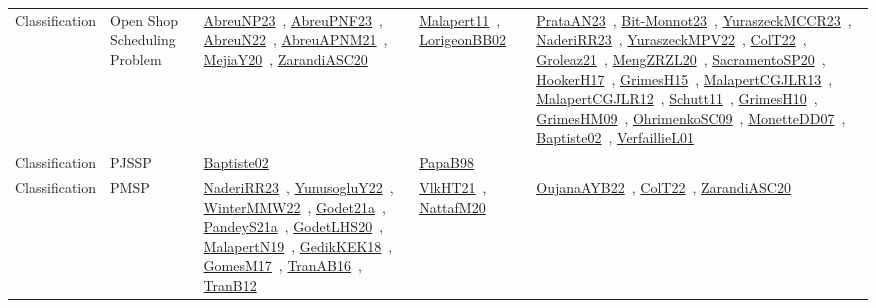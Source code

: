 {\begin{longtable}{lp{3cm}>{\raggedright\arraybackslash}p{6cm}>{\raggedright\arraybackslash}p{6cm}>{\raggedright\arraybackslash}p{8cm}}
Classification & Open Shop Scheduling Problem & \href{works/AbreuNP23.pdf}{AbreuNP23}~\cite{AbreuNP23}, \href{works/AbreuPNF23.pdf}{AbreuPNF23}~\cite{AbreuPNF23}, \href{works/AbreuN22.pdf}{AbreuN22}~\cite{AbreuN22}, \href{works/AbreuAPNM21.pdf}{AbreuAPNM21}~\cite{AbreuAPNM21}, \href{works/MejiaY20.pdf}{MejiaY20}~\cite{MejiaY20}, \href{works/ZarandiASC20.pdf}{ZarandiASC20}~\cite{ZarandiASC20} & \href{works/Malapert11.pdf}{Malapert11}~\cite{Malapert11}, \href{works/LorigeonBB02.pdf}{LorigeonBB02}~\cite{LorigeonBB02} & \href{works/PrataAN23.pdf}{PrataAN23}~\cite{PrataAN23}, \href{works/Bit-Monnot23.pdf}{Bit-Monnot23}~\cite{Bit-Monnot23}, \href{works/YuraszeckMCCR23.pdf}{YuraszeckMCCR23}~\cite{YuraszeckMCCR23}, \href{works/NaderiRR23.pdf}{NaderiRR23}~\cite{NaderiRR23}, \href{works/YuraszeckMPV22.pdf}{YuraszeckMPV22}~\cite{YuraszeckMPV22}, \href{works/ColT22.pdf}{ColT22}~\cite{ColT22}, \href{works/Groleaz21.pdf}{Groleaz21}~\cite{Groleaz21}, \href{works/MengZRZL20.pdf}{MengZRZL20}~\cite{MengZRZL20}, \href{works/SacramentoSP20.pdf}{SacramentoSP20}~\cite{SacramentoSP20}, \href{works/HookerH17.pdf}{HookerH17}~\cite{HookerH17}, \href{works/GrimesH15.pdf}{GrimesH15}~\cite{GrimesH15}, \href{works/MalapertCGJLR13.pdf}{MalapertCGJLR13}~\cite{MalapertCGJLR13}, \href{works/MalapertCGJLR12.pdf}{MalapertCGJLR12}~\cite{MalapertCGJLR12}, \href{works/Schutt11.pdf}{Schutt11}~\cite{Schutt11}, \href{works/GrimesH10.pdf}{GrimesH10}~\cite{GrimesH10}, \href{works/GrimesHM09.pdf}{GrimesHM09}~\cite{GrimesHM09}, \href{works/OhrimenkoSC09.pdf}{OhrimenkoSC09}~\cite{OhrimenkoSC09}, \href{works/MonetteDD07.pdf}{MonetteDD07}~\cite{MonetteDD07}, \href{works/Baptiste02.pdf}{Baptiste02}~\cite{Baptiste02}, \href{works/VerfaillieL01.pdf}{VerfaillieL01}~\cite{VerfaillieL01}\\
Classification & PJSSP & \href{works/Baptiste02.pdf}{Baptiste02}~\cite{Baptiste02} & \href{works/PapaB98.pdf}{PapaB98}~\cite{PapaB98} & \\
Classification & PMSP & \href{works/NaderiRR23.pdf}{NaderiRR23}~\cite{NaderiRR23}, \href{works/YunusogluY22.pdf}{YunusogluY22}~\cite{YunusogluY22}, \href{works/WinterMMW22.pdf}{WinterMMW22}~\cite{WinterMMW22}, \href{works/Godet21a.pdf}{Godet21a}~\cite{Godet21a}, \href{works/PandeyS21a.pdf}{PandeyS21a}~\cite{PandeyS21a}, \href{works/GodetLHS20.pdf}{GodetLHS20}~\cite{GodetLHS20}, \href{works/MalapertN19.pdf}{MalapertN19}~\cite{MalapertN19}, \href{works/GedikKEK18.pdf}{GedikKEK18}~\cite{GedikKEK18}, \href{works/GomesM17.pdf}{GomesM17}~\cite{GomesM17}, \href{works/TranAB16.pdf}{TranAB16}~\cite{TranAB16}, \href{works/TranB12.pdf}{TranB12}~\cite{TranB12} & \href{works/VlkHT21.pdf}{VlkHT21}~\cite{VlkHT21}, \href{works/NattafM20.pdf}{NattafM20}~\cite{NattafM20} & \href{works/OujanaAYB22.pdf}{OujanaAYB22}~\cite{OujanaAYB22}, \href{works/ColT22.pdf}{ColT22}~\cite{ColT22}, \href{works/ZarandiASC20.pdf}{ZarandiASC20}~\cite{ZarandiASC20}\\

\end{longtable}}
